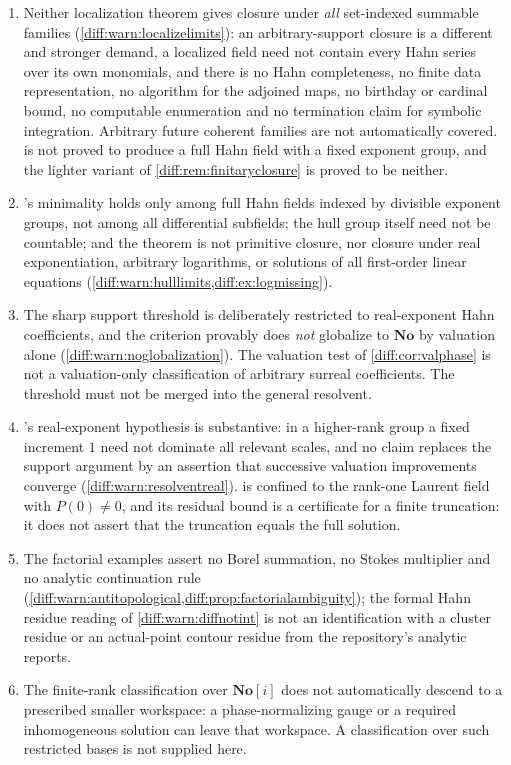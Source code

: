 \documentclass[11pt,letterpaper]{article}
\numberwithin{equation}{section}
\theoremstyle{definition}
\theoremstyle{remark}
\newcommand{\No}{\mathbf{No}}
\newcommand{\SC}{\mathbf{No}[i]}
\begin{document}
\begin{enumerate}[label=\textup{N\arabic*.},leftmargin=3.0em,itemsep=0.35em,start=33]
\item Neither localization theorem gives closure under \emph{all} set-indexed
summable families (\cref{diff:warn:localizelimits}): an arbitrary-support
closure is a different and stronger demand, a localized field need not contain
every Hahn series over its own monomials, and there is no Hahn completeness, no
finite data representation, no algorithm for the adjoined maps, no birthday or
cardinal bound, no computable enumeration and no termination claim for
symbolic integration. Arbitrary future coherent families are not automatically
covered.  is not proved to produce a full Hahn field
with a fixed exponent group, and the lighter variant of
\cref{diff:rem:finitaryclosure} is proved to be neither.
\item {}'s minimality holds only among full Hahn fields
indexed by divisible exponent groups, not among all differential subfields;
the hull group itself need not be countable; and the theorem is not primitive
closure, nor closure under real exponentiation, arbitrary logarithms, or
solutions of all first-order linear equations
(\cref{diff:warn:hulllimits,diff:ex:logmissing}).
\item The sharp support threshold is deliberately restricted to real-exponent
Hahn coefficients, and the criterion provably does \emph{not} globalize to
$\No$ by valuation alone (\cref{diff:warn:noglobalization}). The valuation
test of \cref{diff:cor:valphase} is not a valuation-only classification of
arbitrary surreal coefficients. The threshold must not be merged into the
general resolvent.
\item {}'s real-exponent hypothesis is substantive: in
a higher-rank group a fixed increment $1$ need not dominate all relevant
scales, and no claim replaces the support argument by an assertion that
successive valuation improvements converge
(\cref{diff:warn:resolventreal}).  is confined to
the rank-one Laurent field with $P(0)\neq0$, and its residual bound is a
certificate for a finite truncation: it does not assert that the truncation
equals the full solution.
\item The factorial examples assert no Borel summation, no Stokes multiplier
and no analytic continuation rule
(\cref{diff:warn:antitopological,diff:prop:factorialambiguity}); the formal
Hahn residue reading of \cref{diff:warn:diffnotint} is not an identification
with a cluster residue or an actual-point contour residue from the
repository's analytic reports.
\item The finite-rank classification over $\SC$ does not automatically
descend to a prescribed smaller workspace: a phase-normalizing gauge or a
required inhomogeneous solution can leave that workspace. A classification
over such restricted bases is not supplied here.
\end{enumerate}
\end{document}
